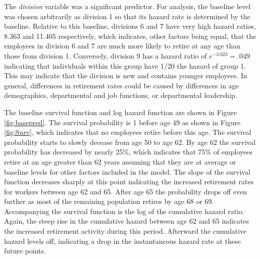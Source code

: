 \documentclass[12pt,letterpaper]{article}
\begin{document}
The {\it division} variable was a significant predictor.  For analysis, the baseline level was chosen arbitrarily as division 1 so that its hazard rate is determined by the baseline.  Relative to this baseline, divisions 6 and 7 have very high hazard ratios, 8.363 and 11.405 respectively, which indicates, other factors being equal, that the employees in division 6 and 7 are much more likely to retire at any age than those from division 1.  Conversely, division 9 has a hazard ratio of $e^{-3.023} = .049$ indicating that individuals within this group have 1/20 the hazard of group 1.  This may indicate that the division is new and contains younger employees.  In general, differences in retirement rates could be caused by differences in age demographics, departmental and job functions, or departmental leadership.

The baseline survival function and log hazard function are shown in Figure \ref{fig:basepred}. The survival probability is 1 before age 49 as shown in Figure \ref{fig:Surv}, which indicates that no employees retire before this age. The survival probability starts to slowly decease from age 50 to age 62. By age 62 the survival probability has decreased by nearly 25\%, which indicates that 75\% of employees retire at an age greater than 62 years assuming that they are at average or baseline levels for other factors included in the model.  The slope of the survival function decreases sharply at this point indicating the increased retirement rates for workers between age 62 and 65.  After age 65 the probability drops off even further as most of the remaining population retires by age 68 or 69. Accompanying the survival function is the log of the cumulative hazard ratio.  Again, the steep rise in the cumulative hazard between age 62 and 65 indicates the increased retirement activity during this period.  Afterward the cumulative hazard levels off, indicating a drop in the instantaneous hazard rate at these future points.
\end{document}
